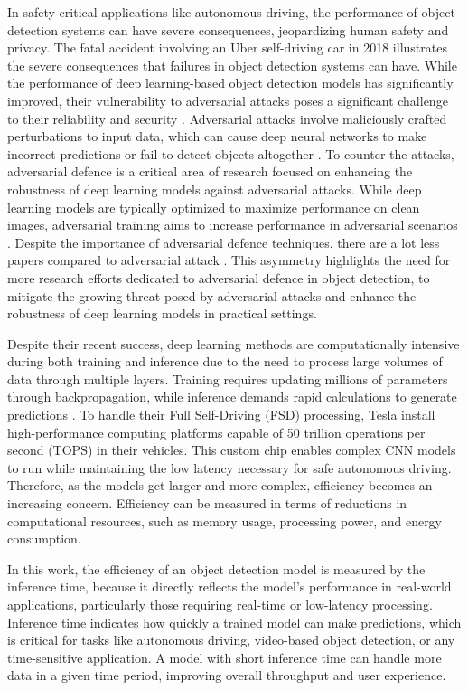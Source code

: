 \documentclass[journal,onecolumn,12pt]{IEEEtran}
\begin{document}
In safety-critical applications like autonomous driving, the performance of object detection systems can have severe consequences, jeopardizing human safety and privacy. The fatal accident involving an Uber self-driving car in 2018 illustrates the severe consequences that failures in object detection systems can have. While the performance of deep learning-based object detection models has significantly improved, their vulnerability to adversarial attacks poses a significant challenge to their reliability and security \cite{zhang2019adversarially}. Adversarial attacks involve maliciously crafted perturbations to input data, which can cause deep neural networks to make incorrect predictions or fail to detect objects altogether \cite{li2019rosa}. To counter the attacks, adversarial defence is a critical area of research focused on enhancing the robustness of deep learning models against adversarial attacks. While deep learning models are typically optimized to maximize performance on clean images, adversarial training aims to increase performance in adversarial scenarios  \cite{costa2023deep}. Despite the importance of adversarial defence techniques, there are a lot less papers compared to adversarial attack \cite{bai2021recent}. This asymmetry highlights the need for more research efforts dedicated to adversarial defence in object detection, to mitigate the growing threat posed by adversarial attacks and enhance the robustness of deep learning models in practical settings.


Despite their recent success, deep learning methods are computationally intensive during both training and inference due to the need to process large volumes of data through multiple layers. Training requires updating millions of parameters through backpropagation, while inference demands rapid calculations to generate predictions \cite{objDetect}. To handle their Full Self-Driving (FSD) processing, Tesla install high-performance computing platforms capable of 50 trillion operations per second (TOPS) in their vehicles. This custom chip enables complex CNN models to run while maintaining the low latency necessary for safe autonomous driving. Therefore, as the models get larger and more complex, efficiency becomes an increasing concern. Efficiency can be measured in terms of reductions in computational resources, such as memory usage, processing power, and energy consumption. 

In this work, the efficiency of an object detection model is measured by the inference time, because it directly reflects the model’s performance in real-world applications, particularly those requiring real-time or low-latency processing. Inference time indicates how quickly a trained model can make predictions, which is critical for tasks like autonomous driving, video-based object detection, or any time-sensitive application. A model with short inference time can handle more data in a given time period, improving overall throughput and user experience.
\end{document}
